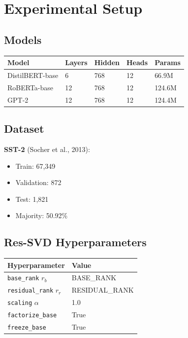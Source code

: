 \section{Experimental Setup}

\subsection{Models}

\begin{table}[H]
\centering
\small
\begin{tabular}{lllll}
\toprule
\textbf{Model} & \textbf{Layers} & \textbf{Hidden} & \textbf{Heads} & \textbf{Params} \\
\midrule
DistilBERT-base & 6 & 768 & 12 & 66.9M \\
RoBERTa-base & 12 & 768 & 12 & 124.6M \\
GPT-2 & 12 & 768 & 12 & 124.4M \\
\bottomrule
\end{tabular}
\end{table}

\subsection{Dataset}

\textbf{SST-2} (Socher et al., 2013):
\begin{itemize}
\item Train: 67,349
\item Validation: 872
\item Test: 1,821
\item Majority: 50.92\%

\end{itemize}
\subsection{Res-SVD Hyperparameters}

\begin{table}[H]
\centering
\small
\begin{tabular}{ll}
\toprule
\textbf{Hyperparameter} & \textbf{Value} \\
\midrule
\texttt{base\_rank} $r_b$ & {{BASE\_RANK}} \\
\texttt{residual\_rank} $r_r$ & {{RESIDUAL\_RANK}} \\
\texttt{scaling} $\alpha$ & 1.0 \\
\texttt{factorize\_base} & True \\
\texttt{freeze\_base} & True \\
\bottomrule
\end{tabular}
\end{table}

